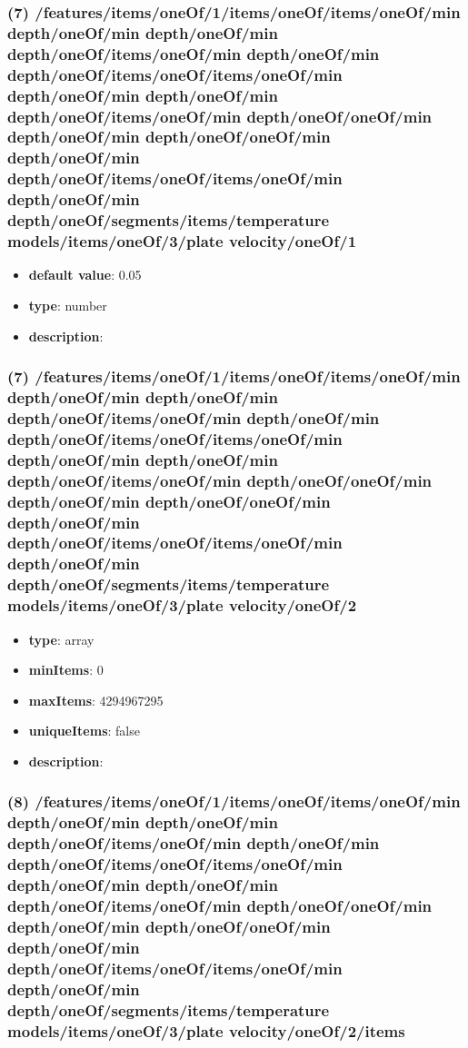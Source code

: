 \subsubsection{(7) /features/items/oneOf/1/items/oneOf/items/oneOf/min depth/oneOf/min depth/oneOf/min depth/oneOf/items/oneOf/min depth/oneOf/min depth/oneOf/items/oneOf/items/oneOf/min depth/oneOf/min depth/oneOf/min depth/oneOf/items/oneOf/min depth/oneOf/oneOf/min depth/oneOf/min depth/oneOf/oneOf/min depth/oneOf/min depth/oneOf/items/oneOf/items/oneOf/min depth/oneOf/min depth/oneOf/segments/items/temperature models/items/oneOf/3/plate velocity/oneOf/1}
\begin{itemize}[leftmargin=7em]\item {\bf default value}: 0.05
\item {\bf type}: number
\item {\bf description}: 
\end{itemize}\subsubsection{(7) /features/items/oneOf/1/items/oneOf/items/oneOf/min depth/oneOf/min depth/oneOf/min depth/oneOf/items/oneOf/min depth/oneOf/min depth/oneOf/items/oneOf/items/oneOf/min depth/oneOf/min depth/oneOf/min depth/oneOf/items/oneOf/min depth/oneOf/oneOf/min depth/oneOf/min depth/oneOf/oneOf/min depth/oneOf/min depth/oneOf/items/oneOf/items/oneOf/min depth/oneOf/min depth/oneOf/segments/items/temperature models/items/oneOf/3/plate velocity/oneOf/2}
\begin{itemize}[leftmargin=7em]\item {\bf type}: array
\item {\bf minItems}: 0
\item {\bf maxItems}: 4294967295
\item {\bf uniqueItems}: false
\item {\bf description}: 
\end{itemize}\subsubsection{(8) /features/items/oneOf/1/items/oneOf/items/oneOf/min depth/oneOf/min depth/oneOf/min depth/oneOf/items/oneOf/min depth/oneOf/min depth/oneOf/items/oneOf/items/oneOf/min depth/oneOf/min depth/oneOf/min depth/oneOf/items/oneOf/min depth/oneOf/oneOf/min depth/oneOf/min depth/oneOf/oneOf/min depth/oneOf/min depth/oneOf/items/oneOf/items/oneOf/min depth/oneOf/min depth/oneOf/segments/items/temperature models/items/oneOf/3/plate velocity/oneOf/2/items}
